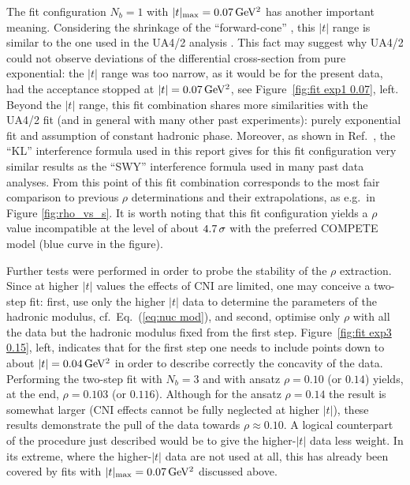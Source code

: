 The fit configuration $N_b=1$ with $|t|_{\rm max} = 0.07\,{\rm GeV^2}$ has another important meaning. Considering the shrinkage of the ``forward-cone'' , this $|t|$ range is similar to the one used in the UA4/2 analysis \cite{ua4-rho}. This fact may suggest why UA4/2 could not observe deviations of the differential cross-section from pure exponential: the $|t|$ range was too narrow, as it would be for the present data, had the acceptance stopped at $|t| = 0.07\,{\rm GeV^2}$, see Figure~\ref{fig:fit exp1 0.07}, left. Beyond the $|t|$ range, this fit combination shares more similarities with the UA4/2 fit (and in general with many other past experiments): purely exponential fit and assumption of constant hadronic phase. Moreover, as shown in Ref.~\cite{totem-8tev-1km}, the ``KL'' interference formula \cite{kl94} used in this report gives for this fit configuration very similar results as the ``SWY'' interference formula \cite{wy68} used in many past data analyses. From this point of this fit combination corresponds to the most fair comparison to previous $\rho$ determinations and their extrapolations, as e.g.~in Figure \ref{fig:rho_vs_s}. It is worth noting that this fit configuration yields a $\rho$ value incompatible at the level of about $4.7\,{\rm \sigma}$ %
with the preferred COMPETE model (blue curve in the figure).

Further tests were performed in order to probe the stability of the $\rho$ extraction. Since at higher $|t|$ values the effects of CNI are limited, one may conceive a two-step fit: first, use only the higher $|t|$ data to determine the parameters of the hadronic modulus, cf.~Eq.~(\ref{eq:nuc mod}), and second, optimise only $\rho$ with all the data but the hadronic modulus fixed from the first step. Figure~\ref{fig:fit exp3 0.15}, left, indicates that for the first step one needs to include points down to about $|t| = 0.04\,{\rm GeV^2}$ in order to describe correctly the concavity of the data. Performing the two-step fit with $N_b=3$ and with ansatz $\rho = 0.10$ (or $0.14$) yields, at the end, $\rho = 0.103$ (or $0.116$). %
Although for the ansatz $\rho = 0.14$ the result is somewhat larger (CNI effects cannot be fully neglected at higher $|t|$), these results demonstrate the pull of the data towards $\rho \approx 0.10$. A logical counterpart of the procedure just described would be to give the higher-$|t|$ data less weight. In its extreme, where the higher-$|t|$ data are not used at all, this has already been covered by fits with $|t|_{\rm max} = 0.07\,{\rm GeV^2}$ discussed above.


